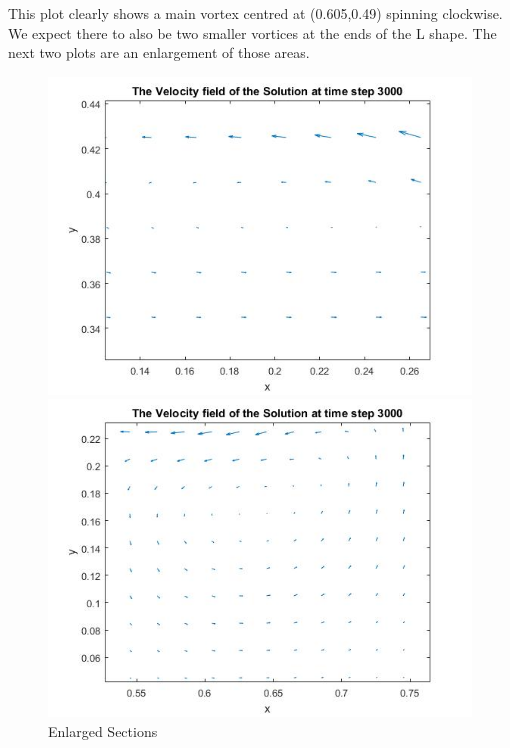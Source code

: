 \documentclass[11pt,a4paper,notitlepage]{article}
\begin{document}
This plot clearly shows a main vortex centred at (0.605,0.49) spinning clockwise. We expect there to also be two smaller vortices at the ends of the L shape. The next two plots are an enlargement of those areas.

\newpage

\begin{figure}[h] 
\begin{minipage}{0.5\textwidth}
\includegraphics[width=1.1\linewidth]{CavityVel2.jpg}
\end{minipage}
\begin{minipage}{0.5\textwidth}
\includegraphics[width=1.1\linewidth]{CavityVel3.jpg}
\end{minipage}
\caption{Enlarged Sections}
\label{cav.vel2}
\end{figure}
\end{document}
